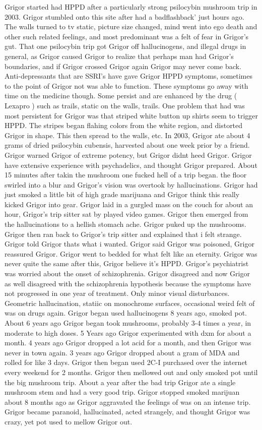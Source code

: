 \documentclass[12pt]{book}
\begin{document}
Grigor started had HPPD after a particularly strong psilocybin mushroom trip in 2003. Grigor stumbled onto this site after had a badflashback' just hours ago. The walls turned to tv static, picture size changed, mind went into ego death and other such related feelings, and most predominant was a felt of fear in Grigor's gut. That one psilocybin trip got Grigor off hallucinogens, and illegal drugs in general, as Grigor caused Grigor to realize that perhaps man had Grigor's boundaries, and if Grigor crossed Grigor again Grigor may never come back. Anti-depressants that are SSRI's have gave Grigor HPPD symptoms, sometimes to the point of Grigor not was able to function. These symptoms go away with time on the medicine though. Some persist and are enhanced by the drug ( Lexapro ) such as trails, static on the walls, trails. One problem that had was most persistent for Grigor was that striped white button up shirts seem to trigger HPPD. The stripes began flahing colors from the white region, and distorted Grigor in shape. This then spread to the walls, etc. In 2003, Grigor ate about 4 grams of dried psilocybin cubensis, harvested about one week prior by a friend. Grigor warned Grigor of extreme potency, but Grigor didnt heed Grigor. Grigor have extensive experience with psychadelics, and thought Grigor prepared. About 15 minutes after takin the mushroom one fucked hell of a trip began. the floor swirled into a blur and Grigor's vision was overtook by hallucinations. Grigor had just smoked a little bit of high grade marijuana and Grigor think this really kicked Grigor into gear. Grigor laid in a gurgled mass on the couch for about an hour, Grigor's trip sitter sat by played video games. Grigor then emerged from the hallucinations to a hellish stomach ache. Grigor puked up the mushrooms. Grigor then ran back to Grigor's trip sitter and explained that i felt strange. Grigor told Grigor thats what i wanted. Grigor said Grigor was poisoned, Grigor reassured Grigor. Grigor went to bedded for what felt like an eternity. Grigor was never quite the same after this, Grigor believe it's HPPD. Grigor's psychiatrist was worried about the onset of schizophrenia. Grigor disagreed and now Grigor as well disagreed with the schizophrenia hypothesis because the symptoms have not progressed in one year of treatment. Only minor visual disturbances. Geometric hallucination, statiic on monochrome surfaces, occasional weird felt of was on drugs again. Grigor began used hallucinogens 8 years ago, smoked pot. About 6 years ago Grigor began took mushrooms, probably 3-4 times a year, in moderate to high doses. 5 Years ago Grigor experimented with dxm for about a month. 4 years ago Grigor dropped a lot acid for a month, and then Grigor was never in town again. 3 years ago Grigor dropped about a gram of MDA and rolled for like 3 days. Grigor then began used 2C-I purchased over the internet every weekend for 2 months. Grigor then mellowed out and only smoked pot until the big mushroom trip. About a year after the bad trip Grigor ate a single mushroom stem and had a very good trip. Grigor stopped smoked marijuan about 8 months ago as Grigor aggravated the feelings of was on an intense trip. Grigor became paranoid, hallucinated, acted strangely, and thought Grigor was crazy, yet pot used to mellow Grigor out. 
\end{document}

